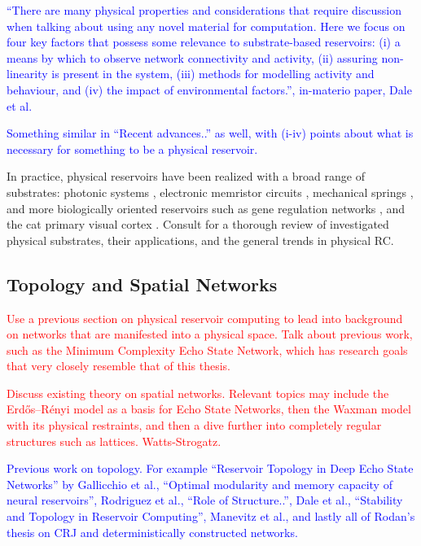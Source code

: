\textcolor{blue}{
  ``There are many physical properties and considerations that require
discussion when talking about using any novel material for computation. Here we
focus on four key factors that possess some relevance to substrate-based
reservoirs: (i) a means by which to observe network connectivity and activity,
(ii) assuring non-linearity is present in the system, (iii) methods for
modelling activity and behaviour, and (iv) the impact of environmental
factors.'', in-materio paper, Dale et al.
}

\textcolor{blue}{
  Something similar in ``Recent advances..'' as well, with (i-iv) points about
what is necessary for something to be a physical reservoir.
}

In practice, physical reservoirs have been realized with a broad range of
substrates: photonic systems \cite{vandoorne_experimental_2014}, electronic
memristor circuits \cite{kulkarni_memristor-based_2012}, mechanical springs
\cite{hauser_towards_2011}, and more biologically oriented reservoirs such as
gene regulation networks \cite{jones_is_2007}, and the cat primary visual cortex
\cite{scholkopf_temporal_2007}. Consult \cite{tanaka_recent_2018} for a thorough
review of investigated physical substrates, their applications, and the general
trends in physical RC.

\subsection{Topology and Spatial Networks}

\textcolor{red}{
  Use a previous section on physical reservoir computing to lead into background
on networks that are manifested into a physical space. Talk about previous work,
such as the Minimum Complexity Echo State Network, which has research goals that
very closely resemble that of this thesis.
}

\textcolor{red}{
  Discuss existing theory on spatial networks. Relevant topics may include the
Erdős–Rényi model as a basis for Echo State Networks, then the Waxman model with
its physical restraints, and then a dive further into completely regular
structures such as lattices. Watts-Strogatz.
}

\textcolor{blue}{
  Previous work on topology. For example ``Reservoir Topology in Deep Echo State
Networks'' by Gallicchio et al., ``Optimal modularity and memory capacity of
neural reservoirs'', Rodriguez et al., ``Role of Structure..'', Dale et al.,
``Stability and Topology in Reservoir Computing'', Manevitz et al., and lastly
all of Rodan's thesis on CRJ and deterministically constructed networks.
}

